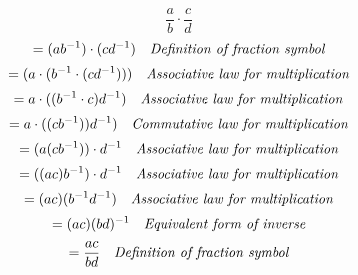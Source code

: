 \documentclass{article}
\begin{document}
\begin{equation*}
	\frac{a}{b} \cdot \frac{c}{d} 
\end{equation*}
\begin{equation*}
	= (ab^{-1}) \cdot (cd^{-1}) \ \ \ \emph{Definition of fraction symbol}
\end{equation*}
\begin{equation*}
	= (a \cdot (b^{-1} \cdot (cd^{-1}))) \ \ \ \mbox{\emph{Associative law for multiplication}}
\end{equation*}
\begin{equation*}
	= a \cdot ((b^{-1} \cdot c) d^{-1}) \ \ \ \mbox{\emph{Associative law for multiplication}}
\end{equation*}
\begin{equation*}
	= a \cdot ((cb^{-1}))d^{-1}) \ \ \ \mbox{\emph{Commutative law for multiplication}}
\end{equation*}
\begin{equation*}
	= (a(cb^{-1})) \cdot d^{-1} \ \ \ \mbox{\emph{Associative law for multiplication}}
\end{equation*}
\begin{equation*}
	= ((ac)b^{-1}) \cdot d^{-1} \ \ \ \mbox{\emph{Associative law for multiplication}}
\end{equation*}
\begin{equation*}
	= (ac)(b^{-1}d^{-1}) \ \ \ \mbox{\emph{Associative law for multiplication}}
\end{equation*}
\begin{equation*}
	= (ac)(bd)^{-1} \ \ \ \mbox{\emph{Equivalent form of inverse}}
\end{equation*}
\begin{equation*}
	= \frac{ac}{bd} \ \ \ \emph{Definition of fraction symbol}
\end{equation*}
\end{document}
